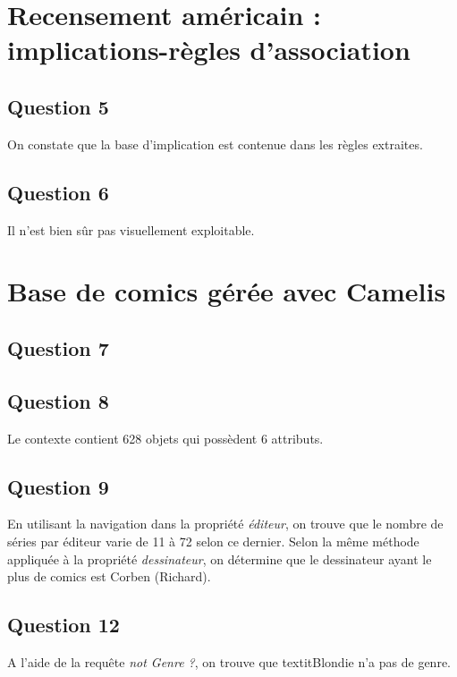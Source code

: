 \documentclass[a4paper,12pt]{article}
\begin{document}
\section{Recensement américain : implications-règles d'association}
\subsection{Question 5}
On constate que la base d'implication est contenue dans les règles extraites.

\subsection{Question 6}
Il n'est bien sûr pas visuellement exploitable. %

\section{Base de comics gérée avec Camelis}
\subsection{Question 7}


\subsection{Question 8}
Le contexte contient 628 objets qui possèdent 6 attributs.

\subsection{Question 9}
En utilisant la navigation dans la propriété \textit{éditeur}, on trouve que le nombre de séries par éditeur varie de 11 à 72 selon ce dernier. Selon la même méthode appliquée à la propriété \textit{dessinateur}, on détermine que le dessinateur ayant le plus de comics est Corben (Richard).

\subsection{Question 12}
A l'aide de la requête \textit{not Genre ?}, on trouve que textit{Blondie} n'a pas de genre.
\end{document}
